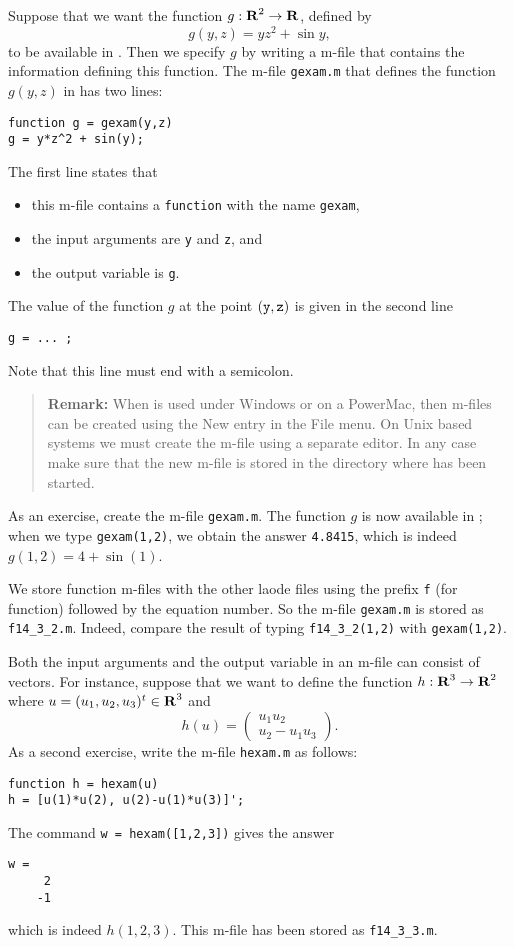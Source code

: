 Suppose that we want the function $g:\mbox{$\bf{R}$}^2\to\mbox{$\bf{R}$}$, defined by
\begin{equation*}  \label{eq:gexam}
g(y,z) = yz^2 + \sin y,
\end{equation*}
to be available in \Matlabp.
Then we specify $g$ by writing a \Matlab m-file that contains the information 
defining this function.  The m-file {\tt gexam.m} that defines the function 
$g(y,z)$ in  has two lines:
\begin{verbatim}
function g = gexam(y,z)
g = y*z^2 + sin(y);
\end{verbatim}
The first line states that 
\begin{itemize}
\item this m-file contains a {\tt function} with the name {\tt gexam},
\item the input arguments are {\tt y} and {\tt z}, and
\item the output variable is {\tt g}.
\end{itemize}
The value of the function $g$ at the point ${\tt (y,z)}$ is given in the 
second line 
\begin{verbatim}
g = ... ;   
\end{verbatim}
Note that this line must end with a semicolon. 
\begin{quote}
{\bf Remark:} When \Matlab is used under Windows or on a PowerMac, then 
m-files
can be created using the {\sf New} entry in the {\sf File} menu.
On Unix based systems we must create the m-file using a separate
editor.  In any case make sure that the new m-file is stored in the directory
where \Matlab has been started.
\end{quote}
As an exercise, create the m-file {\tt gexam.m}.  The function $g$ is 
now available in \Matlabp; when we type {\tt gexam(1,2)}, 
we obtain the answer \verb+4.8415+, which is indeed $g(1,2)=4+\sin(1)$.

We store function m-files with the other {\sf laode} files using the prefix
{\tt f} (for function) followed by the equation number.  So the m-file 
{\tt gexam.m} is stored as {\tt f14\_3\_2.m}.  Indeed, compare the result of 
typing {\tt f14\_3\_2(1,2)} with {\tt gexam(1,2)}.

Both the input arguments and the output variable in an m-file can consist of 
vectors.  For instance, suppose that we want to define the function 
$h:\mbox{$\bf{R}$}^3\to\mbox{$\bf{R}$}^2$ where $u=(u_1,u_2,u_3)^t\in\mbox{$\bf{R}$}^3$ and  
\begin{equation*}
h(u) = \left(\begin{array}{c} u_1 u_2\\ u_2-u_1 u_3 \end{array}\right).
\end{equation*}
As a second exercise, write the m-file {\tt hexam.m} 
as follows:
\begin{verbatim}
function h = hexam(u)
h = [u(1)*u(2), u(2)-u(1)*u(3)]';
\end{verbatim}
The command {\tt w = hexam([1,2,3])} gives the answer
\begin{verbatim}
w =
     2
    -1
\end{verbatim}
which is indeed $h(1,2,3)$.  This m-file has been stored as {\tt f14\_3\_3.m}.

